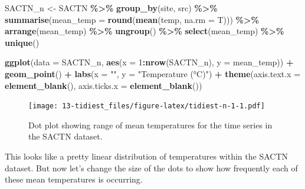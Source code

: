 \documentclass[
]{book}
\newenvironment{Shaded}{\begin{snugshade}}{\end{snugshade}}
\newcommand{\DataTypeTok}[1]{\textcolor[rgb]{0.13,0.29,0.53}{#1}}
\newcommand{\DecValTok}[1]{\textcolor[rgb]{0.00,0.00,0.81}{#1}}
\newcommand{\KeywordTok}[1]{\textcolor[rgb]{0.13,0.29,0.53}{\textbf{#1}}}
\newcommand{\NormalTok}[1]{#1}
\newcommand{\OperatorTok}[1]{\textcolor[rgb]{0.81,0.36,0.00}{\textbf{#1}}}
\newcommand{\StringTok}[1]{\textcolor[rgb]{0.31,0.60,0.02}{#1}}
\begin{document}
\begin{Shaded}
\begin{Highlighting}[]
\NormalTok{ SACTN\_n <{-}}\StringTok{ }\NormalTok{SACTN }\OperatorTok{\%>\%}\StringTok{ }
\StringTok{  }\KeywordTok{group\_by}\NormalTok{(site, src) }\OperatorTok{\%>\%}\StringTok{ }
\StringTok{  }\KeywordTok{summarise}\NormalTok{(}\DataTypeTok{mean\_temp =} \KeywordTok{round}\NormalTok{(}\KeywordTok{mean}\NormalTok{(temp, }\DataTypeTok{na.rm =}\NormalTok{ T))) }\OperatorTok{\%>\%}\StringTok{ }
\StringTok{  }\KeywordTok{arrange}\NormalTok{(mean\_temp) }\OperatorTok{\%>\%}\StringTok{ }
\StringTok{  }\KeywordTok{ungroup}\NormalTok{() }\OperatorTok{\%>\%}\StringTok{ }
\StringTok{  }\KeywordTok{select}\NormalTok{(mean\_temp) }\OperatorTok{\%>\%}\StringTok{ }
\StringTok{  }\KeywordTok{unique}\NormalTok{()}

\KeywordTok{ggplot}\NormalTok{(}\DataTypeTok{data =}\NormalTok{ SACTN\_n, }\KeywordTok{aes}\NormalTok{(}\DataTypeTok{x =} \DecValTok{1}\OperatorTok{:}\KeywordTok{nrow}\NormalTok{(SACTN\_n), }\DataTypeTok{y =}\NormalTok{ mean\_temp)) }\OperatorTok{+}
\StringTok{  }\KeywordTok{geom\_point}\NormalTok{() }\OperatorTok{+}
\StringTok{  }\KeywordTok{labs}\NormalTok{(}\DataTypeTok{x =} \StringTok{""}\NormalTok{, }\DataTypeTok{y =} \StringTok{"Temperature (°C)"}\NormalTok{) }\OperatorTok{+}
\StringTok{  }\KeywordTok{theme}\NormalTok{(}\DataTypeTok{axis.text.x =} \KeywordTok{element\_blank}\NormalTok{(), }
        \DataTypeTok{axis.ticks.x =} \KeywordTok{element\_blank}\NormalTok{())}
\end{Highlighting}
\end{Shaded}

\begin{figure}
\centering
\texttt{[image: 13-tidiest\_files/figure-latex/tidiest-n-1-1.pdf]}
\caption{\label{fig:tidiest-n-1}Dot plot showing range of mean temperatures for the time series in the SACTN dataset.}
\end{figure}

This looks like a pretty linear distribution of temperatures within the SACTN dataset. But now let's change the size of the dots to show how frequently each of these mean temperatures is occurring.
\end{document}
